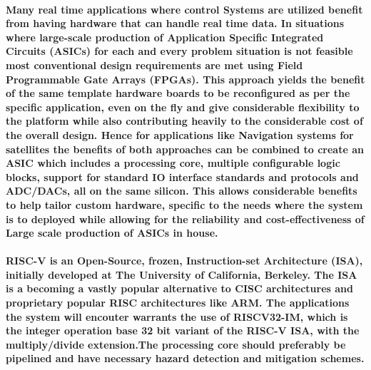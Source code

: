 \documentclass[12pt,a4paper]{report}
\begin{document}
\paragraph{\textrm{\textmd{Many real time applications where control Systems are utilized benefit from having hardware that can handle real time data. In situations where large-scale production of Application Specific Integrated Circuits (ASICs) for each and every problem situation is not feasible most conventional design requirements are met using Field Programmable Gate Arrays (FPGAs). This approach yields the benefit of the same template hardware boards to be reconfigured as per the specific application, even on the fly and give considerable flexibility to the platform while also contributing heavily to the considerable cost of the overall design. Hence for applications like Navigation systems for satellites the benefits of both approaches can be combined to create an ASIC which includes a processing core, multiple configurable logic blocks, support for standard IO interface standards and protocols and ADC/DACs, all on the same silicon. This allows considerable benefits to help tailor custom hardware, specific to the needs where the system is to deployed while allowing for the reliability and cost-effectiveness of Large scale production of ASICs in house.}}}
\paragraph{\textrm{\textmd{RISC-V is an Open-Source, frozen, Instruction-set Architecture (ISA), initially developed at The University of California, Berkeley. The ISA is a becoming a vastly popular alternative to CISC architectures and proprietary popular RISC architectures like ARM. The applications the system will encouter warrants the use of RISCV32-IM, which is the integer operation base 32 bit variant of the RISC-V ISA, with the multiply/divide extension.The processing core should preferably be pipelined and have necessary hazard detection and mitigation schemes.}}}
\end{document}
